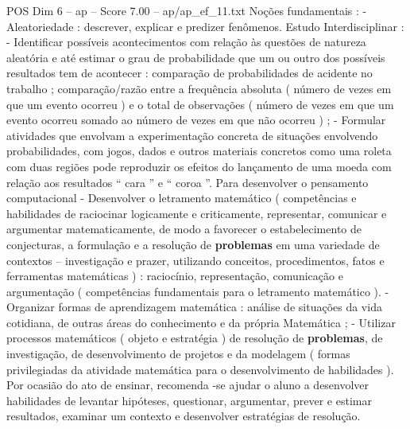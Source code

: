 \begin{textsample}{POS Dim 6 – ap – Score 7.00 – ap/ap\_ef\_11.txt}
Noções fundamentais : - Aleatoriedade : descrever, explicar e predizer fenômenos.
Estudo Interdisciplinar : - Identificar possíveis acontecimentos com relação às questões de natureza aleatória e até estimar o grau de probabilidade que um ou outro dos possíveis resultados tem de acontecer : comparação de probabilidades de acidente no trabalho ; comparação/razão entre a frequência absoluta ( número de vezes em que um evento ocorreu ) e o total de observações ( número de vezes em que um evento ocorreu somado ao número de vezes em que não ocorreu ) ; - Formular atividades que envolvam a experimentação concreta de situações envolvendo probabilidades, com jogos, dados e outros materiais concretos como uma roleta com duas regiões pode reproduzir os efeitos do lançamento de uma moeda com relação aos resultados “ cara ” e “ coroa ”.
Para desenvolver o pensamento computacional - Desenvolver o letramento matemático ( competências e habilidades de raciocinar logicamente e criticamente, representar, comunicar e argumentar matematicamente, de modo a favorecer o estabelecimento de conjecturas, a formulação e a resolução de \textbf{problemas} em uma variedade de contextos – investigação e prazer, utilizando conceitos, procedimentos, fatos e ferramentas matemáticas ) : raciocínio, representação, comunicação e argumentação ( competências fundamentais para o letramento matemático ). - Organizar formas de aprendizagem matemática : análise de situações da vida cotidiana, de outras áreas do conhecimento e da própria Matemática ; - Utilizar processos matemáticos ( objeto e estratégia ) de resolução de \textbf{problemas}, de investigação, de desenvolvimento de projetos e da modelagem ( formas privilegiadas da atividade matemática para o desenvolvimento de habilidades ).
Por ocasião do ato de ensinar, recomenda -se ajudar o aluno a desenvolver habilidades de levantar hipóteses, questionar, argumentar, prever e estimar resultados, examinar um contexto e desenvolver estratégias de resolução.

\end{textsample}
